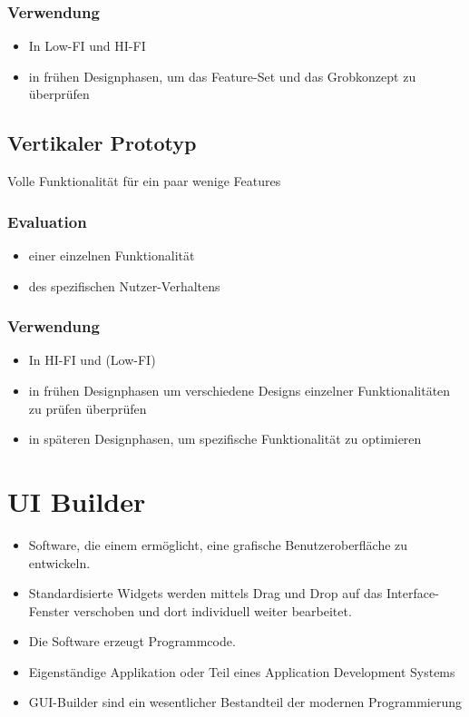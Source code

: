\documentclass[a4paper,10pt]{article}
\begin{document}
\subsubsection{Verwendung}
\begin{itemize}
	\item In Low-FI und HI-FI
	\item in fr\"uhen Designphasen, um das Feature-Set und das Grobkonzept zu \"uberpr\"ufen
\end{itemize}

\subsection{Vertikaler Prototyp}
Volle Funktionalit\"at für ein paar wenige Features
\subsubsection{Evaluation}
\begin{itemize}
	\item einer einzelnen Funktionalit\"at
	\item des spezifischen Nutzer-Verhaltens
\end{itemize}
\subsubsection{Verwendung}
\begin{itemize}
	\item In HI-FI und (Low-FI)
	\item in fr\"uhen Designphasen um verschiedene Designs einzelner Funktionalit\"aten zu pr\"ufen \"uberpr\"ufen
	\item in sp\"ateren Designphasen, um spezifische Funktionalit\"at zu optimieren
\end{itemize}

\section{UI Builder}
\begin{itemize}
	\item Software, die einem erm\"oglicht, eine grafische Benutzeroberfl\"ache zu entwickeln.
	\item Standardisierte Widgets werden mittels Drag und Drop auf das Interface- Fenster verschoben und dort individuell weiter bearbeitet.
	\item Die Software erzeugt Programmcode.
	\item Eigenst\"andige Applikation oder Teil eines Application Development Systems
	\item GUI-Builder sind ein wesentlicher Bestandteil der modernen Programmierung
\end{itemize}
\end{document}
